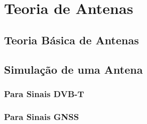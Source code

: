 
\chapter{Teoria de Antenas} %
\label{chap:Chapter3} %

\section{Teoria Básica de Antenas}



\section{Simulação de uma Antena}


\subsection{Para Sinais DVB-T}

\subsection{Para Sinais GNSS}